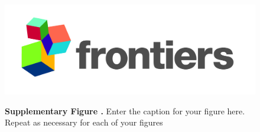 \documentclass{frontiers_suppmat} %
\begin{document}

\begin{figure}
\begin{center}
\includegraphics[width=15cm]{logo1}%
\end{center}
\textbf{\label{fig:01} Supplementary Figure .}{ Enter the caption for your figure here.  Repeat as  necessary for each of your figures }
\end{figure}



%
\end{document}
